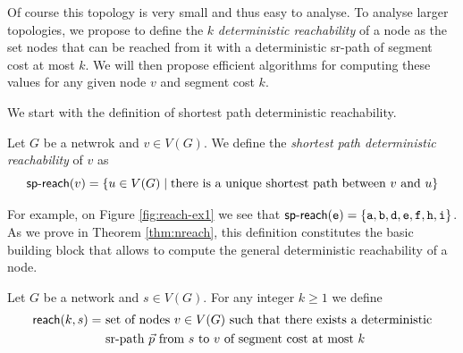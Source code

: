 Of course this topology is very small and thus easy to analyse. To analyse larger topologies, we propose to define the $k$ \emph{deterministic reachability}
of a node as the set nodes that can be reached from it with a deterministic sr-path of segment cost at most $k$. We will then propose 
efficient algorithms for computing these values for any given node $v$ and segment cost $k$.

We start with the definition of shortest path deterministic reachability.

\begin{definition}
\label{def:spreach}
Let $G$ be a netwrok and $v \in V(G)$. We define the \emph{shortest path deterministic reachability} of $v$ as
$$
\textsf{sp-reach}(v) = \left\{ u \in V(G) \mid \textrm{there is a unique shortest path between $v$ and $u$} \right\}
$$
\end{definition}

For example, on Figure \ref{fig:reach-ex1} we see that $\textsf{sp-reach}(\texttt{e}) = \{ \texttt{a}, \texttt{b}, \texttt{d}, \texttt{e}, \texttt{f}, \texttt{h}, \texttt{i} \}$.
As we prove in Theorem \ref{thm:nreach}, this definition constitutes the basic building block that allows to compute the general 
deterministic reachability of a node.

\begin{definition}
Let $G$ be a network and $s \in V(G)$. For any integer $k \geq 1$ we define
\begin{align*}
\textsf{reach}(k, s) = & \ \textrm{set of nodes $v \in V(G)$ such that there exists a deterministic} \\ 
                & \ \textrm{sr-path $\vec{p}$ from $s$ to $v$ of segment cost at most $k$}
\end{align*}
\end{definition}

